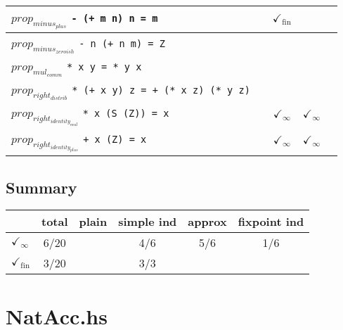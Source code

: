 \documentclass{article}
\begin{document}
\begin{longtable}{p{10cm} || c | c | c | c | }
\hline
$prop_{minus_{plus}}$ \newline \verb`- (+ m n) n = m` &  & $\checkmark_{\mathrm{fin}}$ &  &  \\
\hline
$prop_{minus_{zeroish}}$ \newline \verb`- n (+ n m) = Z` &  &  &  &  \\
\hline
$prop_{mul_{comm}}$ \newline \verb`* x y = * y x` &  &  &  &  \\
\hline
$prop_{right_{distrib}}$ \newline \verb`* (+ x y) z = + (* x z) (* y z)` &  &  &  &  \\
\hline
$prop_{right_{identity_{mul}}}$ \newline \verb`* x (S (Z)) = x` &  & $\checkmark_{\infty}$ & $\checkmark_{\infty}$ &  \\
\hline
$prop_{right_{identity_{plus}}}$ \newline \verb`+ x (Z) = x` &  & $\checkmark_{\infty}$ & $\checkmark_{\infty}$ &  \\
\end{longtable}

\subsection*{Summary}
\begin{longtable}{p{4cm} || c | c | c | c | c | }
  & total & plain & simple ind & approx & fixpoint ind \\
\hline
$\checkmark_{\infty}$ & 6/20 &  & 4/6 & 5/6 & 1/6\\
\hline
$\checkmark_{\mathrm{fin}}$ & 3/20 &  & 3/3 &  & \\
\end{longtable}

\section*{NatAcc.hs}
\end{document}

